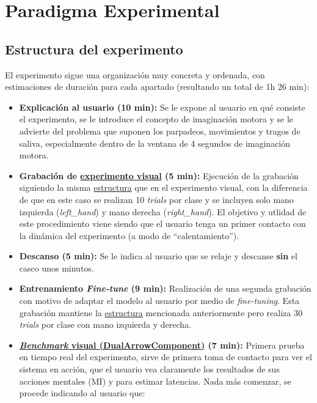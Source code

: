 \section{Paradigma Experimental}
\label{sec:rt_paradigma}

\subsection{Estructura del experimento}
\label{sec:rt_estructura}

El experimento sigue una organización muy concreta y ordenada, con estimaciones
de duración para cada apartado (resultando un total de 1h 26 min):

\begin{itemize}
      \item \textbf{Explicación al usuario (10 min):} Se le expone al usuario en qué consiste el experimento, se le introduce el concepto de imaginación motora y se le advierte del problema que suponen los parpadeos, movimientos y tragos de saliva, especialmente dentro de la ventana de 4 segundos de imaginación motora.
      \item \textbf{Grabación de \hyperref[sec:protocoloAdquisicion]{experimento visual} (5 min):} Ejecución de la grabación siguiendo la misma \hyperref[subsubsec:estructura_grabación]{estructura} que en el experimento visual, con la diferencia de que en este caso se realizan 10 \textit{trials} por clase y se incluyen solo mano izquierda (\textit{left\_hand}) y mano derecha (\textit{right\_hand}). El objetivo y utlidad de este procedimiento viene siendo que el usuario tenga un primer contacto con la dinámica del experimento (a modo de ``calentamiento'').
      \item \textbf{Descanso (5 min):} Se le indica al usuario que se relaje y descanse \textbf{sin} el casco unos minutos.
      \item \textbf{Entrenamiento \textit{Fine-tune} (9 min):} Realización de una segunda grabación con motivo de adaptar el modelo al usuario por medio de \textit{fine-tuning}. Esta grabación mantiene la \hyperref[subsubsec:estructura_grabación]{estructura} mencionada anteriormente pero realiza 30 \textit{trials} por clase con mano izquierda y derecha.
      \item \textbf{\hyperref[subsec:benchmark_visual]{\textit{Benchmark} visual (DualArrowComponent)} (7 min):} Primera prueba en tiempo real del experimento, sirve de primera toma de contacto para ver el sistema en acción, que el usuario vea claramente los resultados de sus acciones mentales (MI) y para estimar latencias. Nada más comenzar, se procede indicando al usuario que:

\end{itemize}
